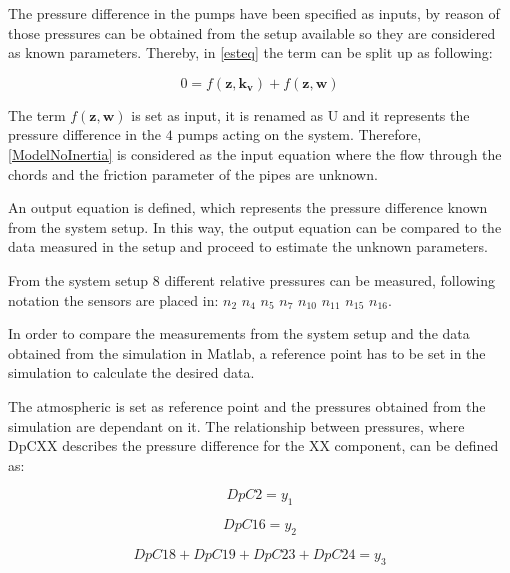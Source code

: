 The pressure difference in the pumps have been specified as inputs, by reason of those pressures can be obtained from the setup available so they are considered 
as known parameters. Thereby, in \eqref{esteq} the term can be split up as following:
 
\begin{equation}
 0 = f(\pmb{z},\pmb{k_v})+ f(\pmb{z},\pmb{w})
 \label{ModelNoInertia}
\end{equation}

The term $f(\pmb{z},\pmb{w})$ is set as input, it is renamed as U and it represents the pressure difference in the $4$ pumps acting on the system. Therefore, 
\eqref{ModelNoInertia} is considered as the input equation where the flow through the chords and the friction parameter of the pipes are unknown. 

An output equation is defined, which represents the pressure difference known from the system setup. In this way, the output equation can be compared 
to the data measured in the setup and proceed to estimate the unknown parameters. 

From the system setup $8$ different relative pressures can be measured, following  notation the sensors are placed in: 
$n_2$ $n_4$ $n_5$ $n_7$ $n_{10}$ $n_{11}$ $n_{15}$ $n_{16}$.

In order to compare the measurements from the system setup and the data obtained from the simulation in Matlab, a reference point has to be set in the 
simulation to calculate the desired data. 

The atmospheric is set as reference point and the pressures obtained from the simulation are dependant on it. The relationship between pressures, where DpCXX describes
the pressure difference for the XX component, can be defined as:

\vspace{4mm}
\begin{equation}
    DpC2 = y_1
\end{equation}

\vspace{4mm}
\begin{equation}
  DpC16 = y_2
\end{equation}

\vspace{4mm}
\begin {equation}
    DpC18 + DpC19 + DpC23 + DpC24 = y_3
\end{equation}

